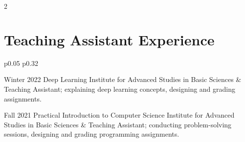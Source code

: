 \documentclass[
	8pt, %
]{FreemanCV}
\begin{document}
\begin{paracol}{2}





\section{Teaching Assistant Experience}
{\renewcommand{\arraystretch}{0.85}
\begin{supertabular}{p{0.05\textwidth} p{0.32\textwidth}} 

	\qualificationentry
		{Winter 2022}
		{Deep Learning}
		{}
		{Institute for Advanced Studies in Basic Sciences}
		{& Teaching Assistant; explaining deep learning concepts, designing and grading assignments.}
	

	\qualificationentry
		{Fall 2021}
		{Practical Introduction to Computer Science}
		{}
		{Institute for Advanced Studies in Basic Sciences}
		{& Teaching Assistant; conducting problem-solving sessions, designing and grading programming assignments.}

	

\end{supertabular}}
\end{paracol}
\end{document}
